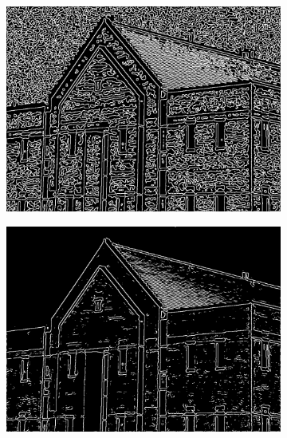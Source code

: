 \begin{figure}[h!]
\begin{subfigure}[b]{0.45\linewidth}
		\includegraphics[width=\linewidth]{myfigure/p9/9_zerocross_0.png}
		\caption{}
		\label{fig:zerocross_0}
	\end{subfigure}
	\begin{subfigure}[b]{0.45\linewidth}
		\includegraphics[width=\linewidth]{myfigure/p9/9_zerocross_4.png}
		\caption{}
		\label{fig:zerocross_4}
	\end{subfigure}
	\begin{subfigure}[b]{0.45\linewidth}

\end{subfigure}
\end{figure}
